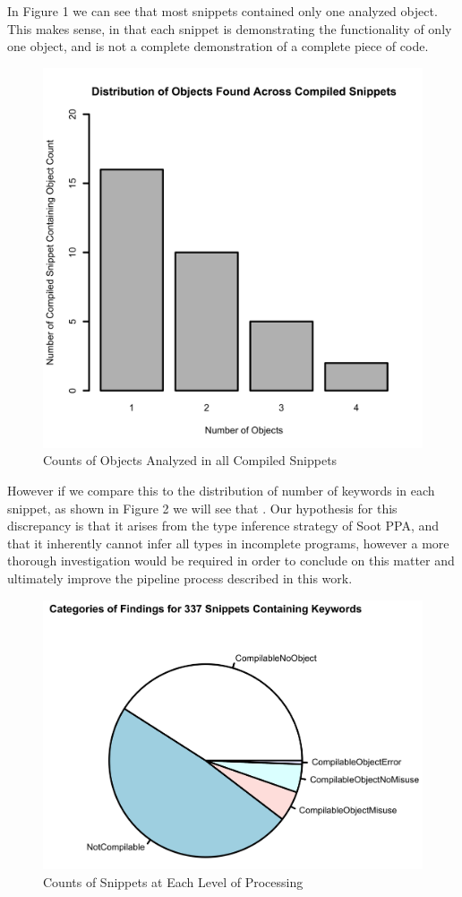 \documentclass[10pt, conference]{IEEEtran}
\begin{document}
In Figure 1 we can see that most snippets contained only one analyzed object. This makes sense, in that each snippet is demonstrating the functionality of only one object, and is not a complete demonstration of a complete piece of code. 
\begin{figure}[h]
\begin{center}
\includegraphics[width=0.9\linewidth]{ObjectDist.png}
\caption{Counts of Objects Analyzed in all Compiled Snippets}
\end{center}
\end{figure}

However if we compare this to the distribution of number of keywords in each snippet, as shown in Figure 2 we will see that . Our hypothesis for this discrepancy is that it arises from the type inference strategy of Soot PPA, and that it inherently cannot infer all types in incomplete programs, however a more thorough investigation would be required in order to conclude on this matter and ultimately improve the pipeline process described in this work. 

\begin{figure}[h]
\begin{center}
\includegraphics[width=0.9\linewidth]{PiePartialMatch.png}
\caption{Counts of Snippets at Each Level of Processing}
\end{center}
\end{figure}
\end{document}
